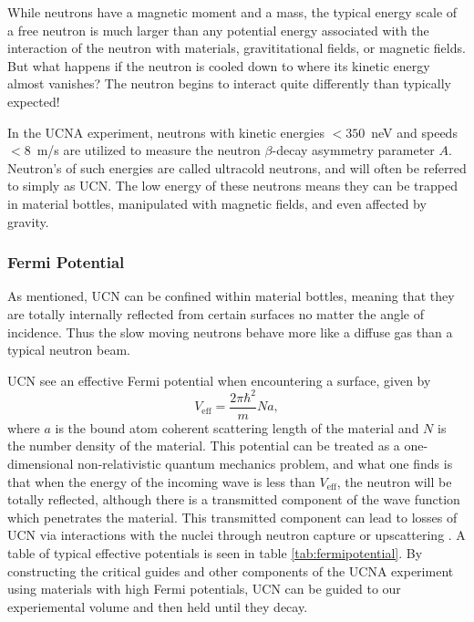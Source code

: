While neutrons have a magnetic moment and a mass, the typical energy scale
of a free neutron is much larger than any potential energy associated with
the interaction of the neutron with materials, gravititational fields,
or magnetic fields. But what happens if the neutron is cooled down
to where its kinetic energy almost vanishes? The neutron begins to interact
quite differently than typically expected!

In the UCNA experiment, neutrons
with kinetic energies $<350$~neV and speeds $<8$~m/s are utilized to measure
the neutron $\beta$-decay asymmetry parameter $A$. Neutron's of such energies
are called ultracold neutrons, and will often be referred to simply as UCN. The
low energy of these neutrons means they can be trapped in material bottles, manipulated
with magnetic fields, and even affected by gravity.

\subsubsection{Fermi Potential} \label{sssec:fermipotential}

As mentioned, UCN can be confined within material bottles, meaning that they are
totally internally reflected from certain surfaces no matter the angle of incidence.
Thus the slow moving neutrons behave more like a diffuse gas than a typical neutron
beam.

UCN see an effective Fermi potential when encountering a surface, given by
%
\begin{equation}
  V_{\mathrm{eff}} = \frac{2\pi\hbar^2}{m}Na,
\end{equation}
where $a$ is the bound atom coherent scattering length of the material and $N$ is the number density of
the material. This potential can be treated as a one-dimensional non-relativistic quantum mechanics problem,
and what one finds is that when the energy of the incoming wave is less than $V_{\mathrm{eff}}$, the neutron will be
totally reflected, although there is a transmitted component of the wave function which penetrates the
material. This transmitted component can lead to losses of UCN via interactions with the nuclei through
neutron capture or upscattering \cite{golub1991ultra}. A table of typical effective potentials is seen
in table \ref{tab:fermipotential}.
By constructing the critical guides and other components of the UCNA experiment using materials with high
Fermi potentials, UCN can be guided to our experiemental volume and then held until they decay.

